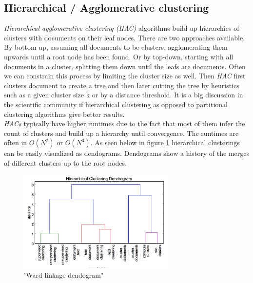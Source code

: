   \subsection{Hierarchical / Agglomerative clustering}
    \emph{Hierarchical agglomerative clustering (HAC)} algorithms build up hierarchies of clusters with  documents on their leaf nodes. There are two approaches available. By bottom-up, assuming all documents to be clusters, agglomerating them upwards until a root node has been found. Or by top-down, starting with all documents in a cluster, splitting them down until the leafs are documents. Often we can constrain this process by limiting the cluster size as well. Then \emph{HAC} first clusters document to create a tree and then later cutting the tree by heuristics such as a given cluster size k or by a distance threshold. It is a big discussion in the scientific community if hierarchical clustering as opposed to partitional clustering algorithms give better results. \cite[chp. 17]{IRBook2008}\\
    \emph{HACs} typically have higher runtimes due to the fact that most of them infer the count of clusters and build up a hierarchy until convergence. The runtimes are often in $O(N^2)$ or $O(N^3)$. As seen below in figure \ref{hac_dendogram} hierarchical clusterings can be easily visualized as dendograms. Dendograms show a history of the merges of different clusters up to the root nodes.

    \begin{figure}[h!]
      \centering
        \includegraphics[width=0.7\textwidth]{dendogram.png}
        \caption{"Ward linkage dendogram"}
        \label{hac_dendogram}
    \end{figure}

